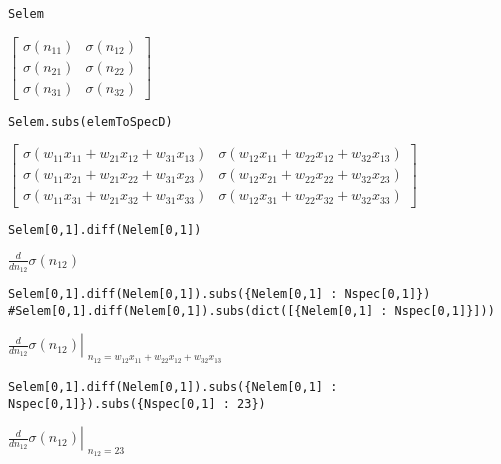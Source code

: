 \documentclass[
]{article}
\begin{document}
\begin{verbatim}
Selem
\end{verbatim}

\(\displaystyle \left[\begin{matrix}\sigma{\left(n_{11} \right)} & \sigma{\left(n_{12} \right)}\\\sigma{\left(n_{21} \right)} & \sigma{\left(n_{22} \right)}\\\sigma{\left(n_{31} \right)} & \sigma{\left(n_{32} \right)}\end{matrix}\right]\)

\begin{verbatim}
Selem.subs(elemToSpecD)
\end{verbatim}

\(\displaystyle \left[\begin{matrix}\sigma{\left(w_{11} x_{11} + w_{21} x_{12} + w_{31} x_{13} \right)} & \sigma{\left(w_{12} x_{11} + w_{22} x_{12} + w_{32} x_{13} \right)}\\\sigma{\left(w_{11} x_{21} + w_{21} x_{22} + w_{31} x_{23} \right)} & \sigma{\left(w_{12} x_{21} + w_{22} x_{22} + w_{32} x_{23} \right)}\\\sigma{\left(w_{11} x_{31} + w_{21} x_{32} + w_{31} x_{33} \right)} & \sigma{\left(w_{12} x_{31} + w_{22} x_{32} + w_{32} x_{33} \right)}\end{matrix}\right]\)

\begin{verbatim}
Selem[0,1].diff(Nelem[0,1])
\end{verbatim}

\(\displaystyle \frac{d}{d n_{12}} \sigma{\left(n_{12} \right)}\)

\begin{verbatim}
Selem[0,1].diff(Nelem[0,1]).subs({Nelem[0,1] : Nspec[0,1]})
#Selem[0,1].diff(Nelem[0,1]).subs(dict([{Nelem[0,1] : Nspec[0,1]}]))
\end{verbatim}

\(\displaystyle \left. \frac{d}{d n_{12}} \sigma{\left(n_{12} \right)} \right|_{\substack{ n_{12}=w_{12} x_{11} + w_{22} x_{12} + w_{32} x_{13} }}\)

\begin{verbatim}
Selem[0,1].diff(Nelem[0,1]).subs({Nelem[0,1] : Nspec[0,1]}).subs({Nspec[0,1] : 23})
\end{verbatim}

\(\displaystyle \left. \frac{d}{d n_{12}} \sigma{\left(n_{12} \right)} \right|_{\substack{ n_{12}=23 }}\)
\end{document}
